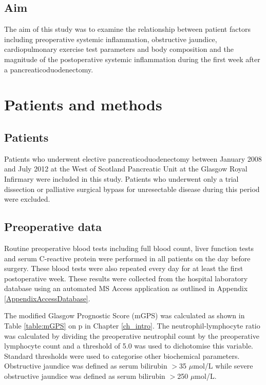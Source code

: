 \subsection{Aim}
The aim of this study was to examine the relationship between patient factors including preoperative systemic inflammation, obstructive jaundice, cardiopulmonary exercise test parameters and body composition and the magnitude of the postoperative systemic inflammation during the first week after a pancreaticoduodenectomy. 


\clearpage
\section{Patients and methods}

\subsection{Patients}
Patients who underwent elective pancreaticoduodenectomy between January 2008 and July 2012 at the West of Scotland Pancreatic Unit at the Glasgow Royal Infirmary were included in this study. 
Patients who underwent only a trial dissection or palliative surgical bypass for unresectable disease during this period were excluded.

\subsection{Preoperative data}
Routine preoperative blood tests including full blood count, liver function tests and serum C-reactive protein were performed in all patients on the day before surgery. 
These blood tests were also repeated every day for at least the first postoperative week. 
These results were collected from the hospital laboratory database using an automated MS Access application as outlined in Appendix \ref{AppendixAccessDatabase}. 

The modified Glasgow Prognostic Score (mGPS) was calculated as shown in Table \ref{table:mGPS} on p\pageref{table:mGPS} in Chapter \ref{ch_intro}. 
The neutrophil-lymphocyte ratio was calculated by dividing the preoperative neutrophil count by the preoperative lymphocyte count and a threshold of 5.0 was used to dichotomise this variable. 
Standard thresholds were used to categorise other biochemical parameters. 
Obstructive jaundice was defined as serum bilirubin $>$35 $\mu$mol/L while severe obstructive jaundice was defined as serum bilirubin $>$250 $\mu$mol/L. 

